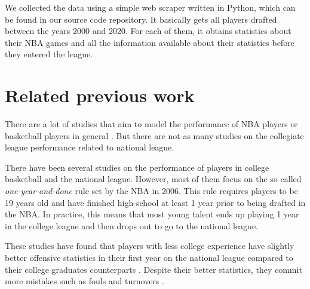 We collected the data using a simple web scraper written in Python, which can be
found in our source code repository. It basically gets all players drafted between the years 2000 and 2020. For each of them, it obtains statistics about their NBA games and all the information available about their statistics before they entered the league.

\section{Related previous work}%
\label{sec:previous-work}

There are a lot of studies that aim to model the performance of NBA players
or basketball players in general \cite{terner_modeling_2020,
casals_modelling_2013, kokanauskas_modelling_2021}.  But there are not as many
studies on the collegiate league performance related to national league.

There have been several studies on the performance of players in college
basketball and the national league. However, most of them focus on the so called
\emph{one-year-and-done} rule \cite{noauthor_nba_2006} set by the NBA in 2006.
This rule requires players to be 19 years old and have finished high-school at least
1 year prior to being drafted in the NBA. In practice, this means that most
young talent ends up playing 1 year in the college league and then drops out to
go to the national league.

These studies have found that players with less college experience have slightly
better offensive statistics in their first year on the national league compared to their
college graduates counterparts \cite{ashley_explaining_2017}. Despite their better statistics,
they commit more mistakes such as fouls and turnovers \cite{zestcott_one_2020}.

